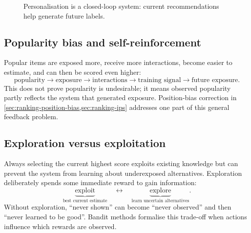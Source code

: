 \begin{figure}[htbp]
\centering
{}
\caption{Personalisation is a closed-loop system: current recommendations help generate future labels.}
\end{figure}

\subsection{Popularity bias and self-reinforcement}
\label{sec:personalisation-popularity}
Popular items are exposed more, receive more interactions, become easier to estimate, and can then be scored even higher:
\[
\text{popularity}
\rightarrow
\text{exposure}
\rightarrow
\text{interactions}
\rightarrow
\text{training signal}
\rightarrow
\text{future exposure}.
\]
This does not prove popularity is undesirable; it means observed popularity partly reflects the system that generated exposure.
Position-bias correction in \cref{sec:ranking-position-bias,sec:ranking-ips} addresses one part of this general feedback problem.

\subsection{Exploration versus exploitation}
\label{sec:personalisation-exploration}
Always selecting the current highest score exploits existing knowledge but can prevent the system from learning about underexposed alternatives.
Exploration deliberately spends some immediate reward to gain information:
\[
\underbrace{\text{exploit}}_{\text{best current estimate}}
\quad\longleftrightarrow\quad
\underbrace{\text{explore}}_{\text{learn uncertain alternatives}}.
\]
Without exploration, ``never shown'' can become ``never observed'' and then ``never learned to be good''.
Bandit methods formalise this trade-off when actions influence which rewards are observed.

